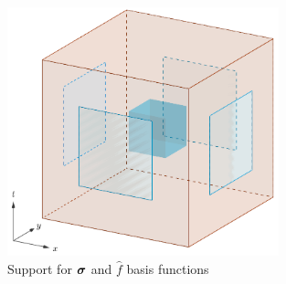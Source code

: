 \documentclass{article}
\begin{document}
\begin{figure}[p]
  \centering
  \includegraphics[width=0.7\textwidth]{flux3D.png}
  \caption{Support for $\boldsymbol\sigma$ and $\hat f$ basis functions}
  \label{fig:flux3D}
\end{figure}
\end{document}
